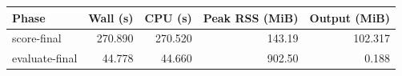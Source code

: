 \begin{tabular}{lrrrr}
\toprule
Phase & Wall (s) & CPU (s) & Peak RSS (MiB) & Output (MiB) \\
\midrule
score-final & 270.890 & 270.520 & 143.19 & 102.317 \\
evaluate-final & 44.778 & 44.660 & 902.50 & 0.188 \\
\bottomrule
\end{tabular}
